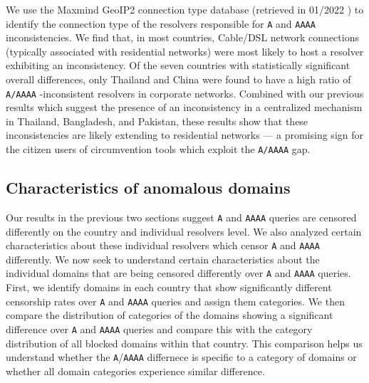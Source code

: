%
We use the Maxmind GeoIP2 connection type database (retrieved in 01/2022
\cite{maxmind-connectiondb}) to identify the connection type of the resolvers
responsible for {\tt A} and {\tt AAAA} inconsistencies. 
%
We find that, in most countries, Cable/DSL network connections (typically
associated with residential networks) were most likely to host a resolver
exhibiting an inconsistency. 
%
Of the seven countries with statistically significant overall differences, only
Thailand and China were found to have a high ratio of {\tt A/AAAA} -inconsistent
resolvers in corporate networks. 
%
Combined with our previous results which suggest the presence of an
inconsistency in a centralized mechanism in Thailand, Bangladesh, and Pakistan,
these results show that these inconsistencies are likely extending to
residential networks --- a promising sign for the citizen users of
circumvention tools which exploit the {\tt A/AAAA} gap.

\subsection{Characteristics of anomalous domains} 
\label{sec:resources:domains}

Our results in the previous two sections suggest {\tt A} and {\tt AAAA} queries 
are censored differently on the country and individual resolvers level. We also
analyzed certain characteristics about these individual resolvers which censor 
{\tt A} and {\tt AAAA} differently. We now seek to understand certain characteristics
about the individual domains that are being censored differently over {\tt A} and 
{\tt AAAA} queries. First, we identify domains in each country that show significantly
different censorship rates over {\tt A} and {\tt AAAA} queries and assign them categories. 
We then compare the distribution of categories of the domains showing a significant 
difference over {\tt A} and {\tt AAAA} queries and compare this with the category
distribution of all blocked domains within that country. This comparison helps us understand
whether the {\tt A}/{\tt AAAA} differnece is specific to a category of domains or 
whether all domain categories experience similar difference.

